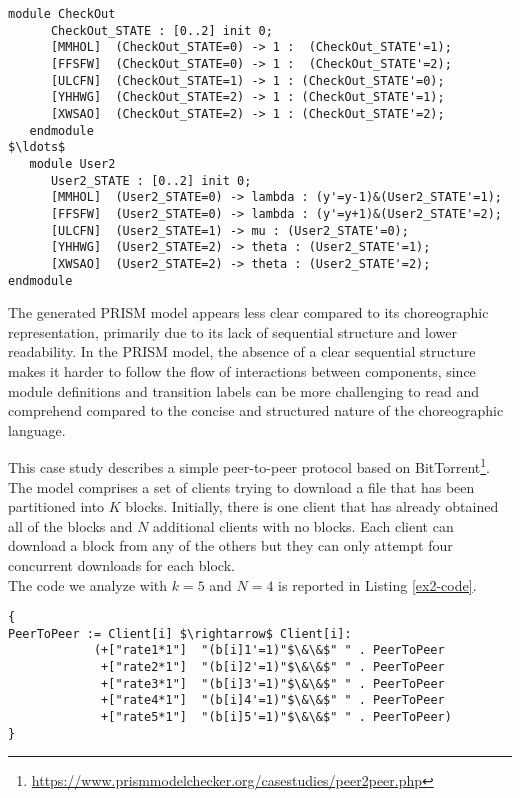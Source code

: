  \begin{lstlisting}[style=prism-color,caption={Generated PRISM program},captionpos=b,label={ex1-gen}]
   module CheckOut
      CheckOut_STATE : [0..2] init 0;
      [MMHOL]  (CheckOut_STATE=0) -> 1 :  (CheckOut_STATE'=1);
      [FFSFW]  (CheckOut_STATE=0) -> 1 :  (CheckOut_STATE'=2);
      [ULCFN]  (CheckOut_STATE=1) -> 1 : (CheckOut_STATE'=0);
      [YHHWG]  (CheckOut_STATE=2) -> 1 : (CheckOut_STATE'=1);
      [XWSAO]  (CheckOut_STATE=2) -> 1 : (CheckOut_STATE'=2);
   endmodule
$\ldots$
   module User2
      User2_STATE : [0..2] init 0;
      [MMHOL]  (User2_STATE=0) -> lambda : (y'=y-1)&(User2_STATE'=1);
      [FFSFW]  (User2_STATE=0) -> lambda : (y'=y+1)&(User2_STATE'=2);
      [ULCFN]  (User2_STATE=1) -> mu : (User2_STATE'=0);
      [YHHWG]  (User2_STATE=2) -> theta : (User2_STATE'=1);
      [XWSAO]  (User2_STATE=2) -> theta : (User2_STATE'=2);
endmodule
\end{lstlisting}
The generated PRISM model appears less clear compared to its
choreographic representation, primarily due to its lack of sequential
structure and lower readability.  In the PRISM model, the absence of a
clear sequential structure makes it harder to follow the flow of
interactions between components, 
since module definitions and transition labels can be more challenging
to read and comprehend compared to the concise and structured nature
of the choreographic language.



This case study describes a simple peer-to-peer protocol based on BitTorrent\footnote{\url{https://www.prismmodelchecker.org/casestudies/peer2peer.php}}. The model comprises a set of clients trying to download a file that has been partitioned into $K$ blocks. Initially, there is one client that has already obtained all of the blocks and $N$ additional clients with no blocks. Each client can download a block from any of the others but they can only attempt four concurrent downloads for each block.\\
The code we analyze with $k=5$ and $N=4$ is reported in Listing \ref{ex2-code}.
\begin{lstlisting}[style=chor-color,caption={Choreography for the Peer-To-Peer Protocol},captionpos=b,label={ex2-code}]
{
PeerToPeer := Client[i] $\rightarrow$ Client[i]: 
			(+["rate1*1"]  "(b[i]1'=1)"$\&\&$" " . PeerToPeer
			 +["rate2*1"]  "(b[i]2'=1)"$\&\&$" " . PeerToPeer
			 +["rate3*1"]  "(b[i]3'=1)"$\&\&$" " . PeerToPeer
			 +["rate4*1"]  "(b[i]4'=1)"$\&\&$" " . PeerToPeer
			 +["rate5*1"]  "(b[i]5'=1)"$\&\&$" " . PeerToPeer)
}
\end{lstlisting} 

